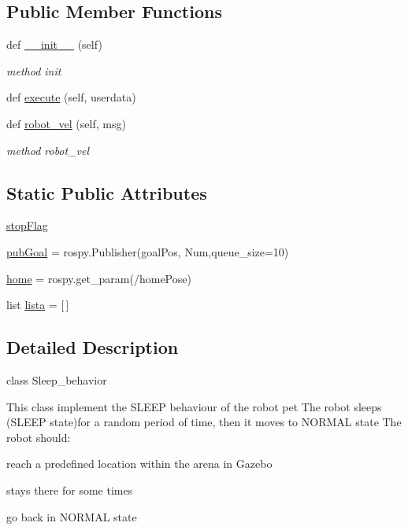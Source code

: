 \subsection*{Public Member Functions}
\begin{DoxyCompactItemize}
\item 
def \hyperlink{classstate__machine_1_1Sleep_a473b93a1ddf11f9e664d1fb694ce1a3c}{\+\_\+\+\_\+init\+\_\+\+\_\+} (self)
\begin{DoxyCompactList}\small\item\em method init \end{DoxyCompactList}\item 
def \hyperlink{classstate__machine_1_1Sleep_a89527836f1edcefb6467fa9c041fbbfe}{execute} (self, userdata)
\item 
def \hyperlink{classstate__machine_1_1Sleep_af89f7f7e1247670de2e6280e3fd1c226}{robot\+\_\+vel} (self, msg)
\begin{DoxyCompactList}\small\item\em method robot\+\_\+vel \end{DoxyCompactList}\end{DoxyCompactItemize}
\subsection*{Static Public Attributes}
\begin{DoxyCompactItemize}
\item 
\hyperlink{classstate__machine_1_1Sleep_a00b879885a7e1f565d91faba0403513d}{stop\+Flag}
\item 
\hyperlink{classstate__machine_1_1Sleep_aaaa470bd53002152ac5b2d3d4ad20c9d}{pub\+Goal} = rospy.\+Publisher(\textquotesingle{}goal\+Pos\textquotesingle{}, Num,queue\+\_\+size=10)
\item 
\hyperlink{classstate__machine_1_1Sleep_a6bd959627ed45867516c94e3eafc05bb}{home} = rospy.\+get\+\_\+param(\textquotesingle{}/home\+Pose\textquotesingle{})
\item 
list \hyperlink{classstate__machine_1_1Sleep_aec191ea286c33d86b339cb95a854ab42}{lista} = \mbox{[}$\,$\mbox{]}
\end{DoxyCompactItemize}


\subsection{Detailed Description}
class Sleep\+\_\+behavior 

This class implement the S\+L\+E\+EP behaviour of the robot pet The robot sleeps (S\+L\+E\+EP state)for a random period of time, then it moves to N\+O\+R\+M\+AL state The robot should\+:
\begin{DoxyItemize}
\item reach a predefined location within the arena in Gazebo
\item stays there for some times
\item go back in N\+O\+R\+M\+AL state 
\end{DoxyItemize}

